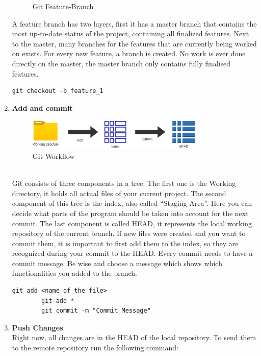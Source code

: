 \begin{enumerate}
\begin{figure}[h]
        \caption{Git Feature-Branch}
        \label{fig:gitbranching}
    \end{figure}
    A feature branch has two layers, first it has a master branch that contains the most up-to-date status of the
    project, containing all finalized features.
    Next to the master, many branches for the features that are currently being worked on exists.
    For every new feature, a branch is created.
    No work is ever done directly on the master, the master branch only contains fully finalised features.
    \begin{lstlisting}[label={lst:lstlisting2}]
		git checkout -b feature_1
    \end{lstlisting}
    \item \textbf{Add and commit} \\
    \begin{figure}[h]
        \centering
        \includegraphics[width=0.8\textwidth]{./images/git_workflow}
        \caption{Git Workflow}
        \label{fig:gitworkflow}
    \end{figure} \\
    Git consists of three components in a tree.
    The first one is the Working directory, it holds all actual files of your current project.
    The second component of this tree is the index, also called \enquote{Staging Area}.
    Here you can decide what parts of the program should be taken into account for the next commit.
    The last component is called HEAD, it represents the local working repository of the current branch.
    If new files were created and you want to commit them, it is important to first add them to the index, so they are
    recognized during your commit to the HEAD. Every commit needs to have a commit message.
    Be wise and choose a message which shows which functionalities you added to the branch.
    \begin{lstlisting}[label={lst:lstlisting2}]
		git add <name of the file>
		git add *
		git commit -m "Commit Message"
    \end{lstlisting}
    \item \textbf{Push Changes} \\
    Right now, all changes are in the HEAD of the local repository.
    To send them to the remote repository run the following command:

\end{enumerate}

